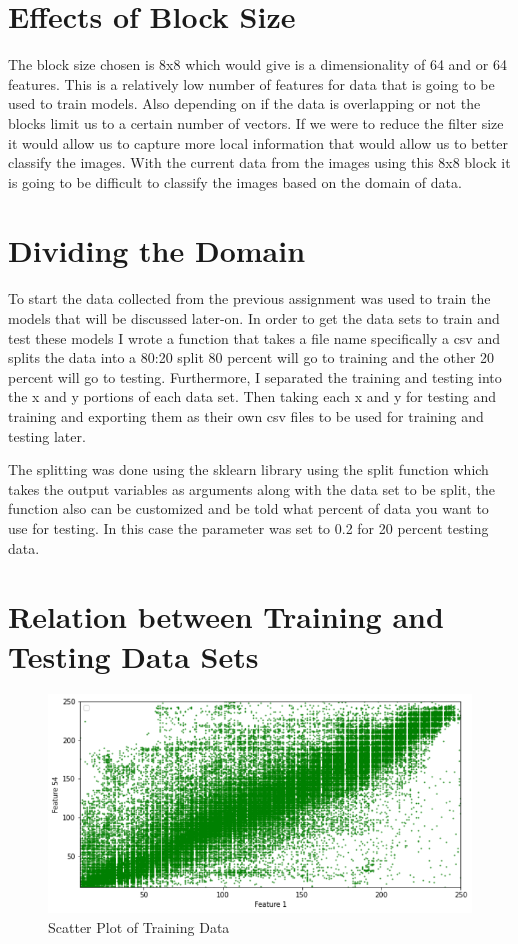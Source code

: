 \documentclass[conference]{IEEEtran}
\begin{document}
\section{Effects of Block Size}
The block size chosen is 8x8 which would give is a dimensionality of 64 and or 64 features. This is a relatively low number of features for data that is going to be used to train models. Also depending on if the data is overlapping or not the blocks limit us to a certain number of vectors. If we were to reduce the filter size it would allow us to capture more local information that would allow us to better classify the images. With the current data from the images using this 8x8 block it is going to be difficult to classify the images based on the domain of data.

\section{Dividing the Domain}
To start the data collected from the previous assignment was used to train the models that will be discussed later-on. In order to get the data sets to train and test these models I wrote a function that takes a file name specifically a csv and splits the data into a 80:20 split 80 percent will go to training and the other 20 percent will go to testing. Furthermore, I separated the training and testing into the x and y portions of each data set. Then taking each x and y for testing and training and exporting them as their own csv files to be used for training and testing later.

The splitting was done using the sklearn library using the split function which takes the output variables as arguments along with the data set to be split, the function also can be customized and be told what percent of data you want to use for testing. In this case the parameter was set to 0.2 for 20 percent testing data.

\section{Relation between Training and Testing Data Sets}
\begin{figure}[h]
  \centering
  \includegraphics[width=\linewidth]{trainingSp.png}
  \caption{Scatter Plot of Training Data}
\end{figure}
\end{document}
